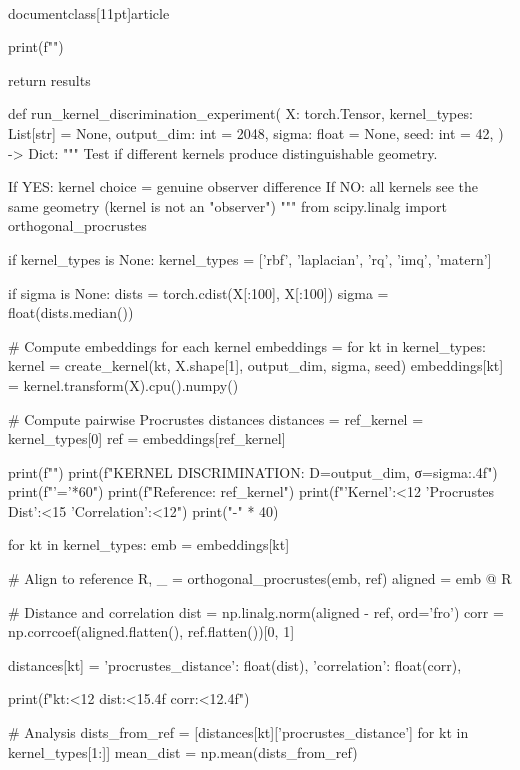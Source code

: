 \\documentclass[11pt]{article}
\begin{document}
\begin{CodeBlock}
    print(f"")
    
    return results


def run_kernel_discrimination_experiment(
    X: torch.Tensor,
    kernel_types: List[str] = None,
    output_dim: int = 2048,
    sigma: float = None,
    seed: int = 42,
) -> Dict:
    """
    Test if different kernels produce distinguishable geometry.
    
    If YES: kernel choice = genuine observer difference
    If NO: all kernels see the same geometry (kernel is not an "observer")
    """
    from scipy.linalg import orthogonal_procrustes
    
    if kernel_types is None:
        kernel_types = ['rbf', 'laplacian', 'rq', 'imq', 'matern']
    
    if sigma is None:
        dists = torch.cdist(X[:100], X[:100])
        sigma = float(dists.median())
    
    # Compute embeddings for each kernel
    embeddings = {}
    for kt in kernel_types:
        kernel = create_kernel(kt, X.shape[1], output_dim, sigma, seed)
        embeddings[kt] = kernel.transform(X).cpu().numpy()
    
    # Compute pairwise Procrustes distances
    distances = {}
    ref_kernel = kernel_types[0]
    ref = embeddings[ref_kernel]
    
    print(f"")
    print(f"KERNEL DISCRIMINATION: D={output_dim}, σ={sigma:.4f}")
    print(f"{'='*60}")
    print(f"Reference: {ref_kernel}")
    print(f"{'Kernel':<12} {'Procrustes Dist':<15} {'Correlation':<12}")
    print("-" * 40)
    
    for kt in kernel_types:
        emb = embeddings[kt]
        
        # Align to reference
        R, _ = orthogonal_procrustes(emb, ref)
        aligned = emb @ R
        
        # Distance and correlation
        dist = np.linalg.norm(aligned - ref, ord='fro')
        corr = np.corrcoef(aligned.flatten(), ref.flatten())[0, 1]
        
        distances[kt] = {
            'procrustes_distance': float(dist),
            'correlation': float(corr),
        }
        
        print(f"{kt:<12} {dist:<15.4f} {corr:<12.4f}")
    
    # Analysis
    dists_from_ref = [distances[kt]['procrustes_distance'] for kt in kernel_types[1:]]
    mean_dist = np.mean(dists_from_ref)
    

\end{CodeBlock}
\end{document}
